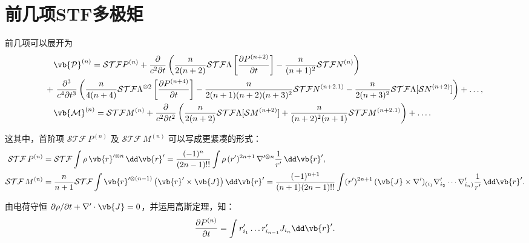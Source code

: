 \section{前几项STF多极矩}
前几项可以展开为
\begin{align*}
	&\vb{\mathcal{P}}^{(n)} = \mathcal{STF}P^{(n)} + \frac{\partial}{c^2 \partial t} \left( \frac{n}{2(n+2)} \mathcal{STF}\Lambda\left[ \frac{\partial P^{(n+2)}}{\partial t} \right] - \frac{n}{(n+1)^2} \mathcal{STF}N^{(n)} \right)\\+ &\,\,\frac{\partial^3}{c^4 \partial t^3} \left( \frac{n}{4(n+4)} \mathcal{STF}\Lambda^{\otimes 2}\left[ \frac{\partial P^{(n+4)}}{\partial t} \right] - \frac{n}{2(n+1)(n+2)(n+3)^2} \mathcal{STF}N^{(n+2.1)} - \frac{n}{2(n+3)^2} \mathcal{STF}\Lambda[\mathcal{S}N^{(n+2)}] \right) + \dots, \\
	&\vb{\mathcal{M}}^{(n)} = \mathcal{STF}M^{(n)} + \frac{\partial}{c^2 \partial t^2} \left( \frac{n}{2(n+2)} \mathcal{STF}\Lambda[\mathcal{S}M^{(n+2)}] + \frac{n}{(n+2)^2(n+1)} \mathcal{STF}M^{(n+2.1)} \right) + \dots.
\end{align*}

这其中，首阶项 \(\mathcal{S}\mathcal{T}\mathcal{F}\, P^{(n)}\) 及 \(\mathcal{S}\mathcal{T}\mathcal{F}\, M^{(n)}\) 可以写成更紧凑的形式：
\begin{align*}
	\mathcal{S}\mathcal{T}\mathcal{F}\, P^{(n)} &= \mathcal{S}\mathcal{T}\mathcal{F} \int \rho \, \vb{r}'^{\otimes n} \, \dd \vb{r}' = \frac{(-1)^n}{(2n-1)!!} \int \rho \, (r')^{2n+1} \, \nabla'^{\otimes n} \frac{1}{r'} \, \dd \vb{r}', \\
	\mathcal{S}\mathcal{T}\mathcal{F}\, M^{(n)} &= \frac{n}{n+1}\mathcal{S}\mathcal{T}\mathcal{F} \int \vb{r}'^{\otimes (n-1)} \left( \vb{r}' \times \vb{J} \right) \dd \vb{r}' = \frac{(-1)^{n+1}}{(n+1)(2n-1)!!} \int (r')^{2n+1} \, (\vb{J} \times \nabla')_{(i_1} \nabla'_{i_2} \cdots \nabla'_{i_n)} \frac{1}{r'} \, \dd \vb{r}'.
\end{align*}

由电荷守恒 \(\partial \rho/\partial t + \nabla' \cdot \vb{J} = 0\)，并运用高斯定理，知：
\begin{align*}
	\frac{\partial P^{(n)}}{\partial t} = \int r'_{i_1} \dots r'_{i_{n-1}} J_{i_n} \dd \vb{r}'.
\end{align*}

